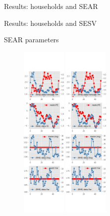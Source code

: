\documentclass{beamer}
\begin{document}
\begin{frame}{Results: households and SEAR}
\begin{frame}{Results: households and SESV}
\begin{figure}[ht]
		\end{figure}
	\end{frame}
	
	\begin{frame}{SEAR parameters}
		\begin{figure}[ht]
			\centering
			\label{SE_diag_SCE}
			\includegraphics[width=0.19\textwidth, height = \0.95\textheight]{figures/sce_se_est_diag0.png}
			\includegraphics[width=0.19\textwidth, height = \0.95\textheight]{figures/sce_se_est_diag1.png}

\end{figure}
\end{frame}
\end{frame}
\end{document}
